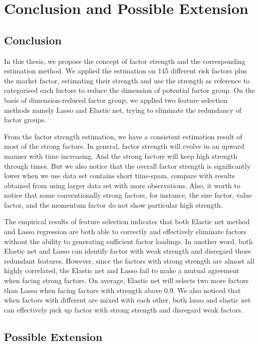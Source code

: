 	\chapter{Conclusion and Possible Extension}\label{Conclusion}
		\section{Conclusion}
In this thesis, we propose the concept of factor strength and the corresponding estimation method.
We applied the estimation on 145 different risk factors plus the market factor, estimating their strength and use the strength as reference to categorised each factors to reduce the dimension of potential factor group.
On the basis of dimension-reduced factor group, we applied two feature selection methods namely Lasso and Elastic net, trying to eliminate the redundancy of factor groups. 

From the factor strength estimation, we have a consistent estimation result of most of the strong factors.
In general, factor strength will evolve in an upward manner with time increasing.
And the strong factors will keep high strength through times.
But we also notice that the overall factor strength is significantly lower when we use data set contains short time-spam, compare with results obtained from using larger data set with more observations.
Also, it worth to notice that some conventionally strong factors, for instance, the size factor, value factor, and the momentum factor do not show particular high strength.

The empirical results of feature selection indicates that both Elastic net method and Lasso regression are both able to correctly and effectively eliminate factors without the ability to generating sufficient factor loadings.
In another word, both Elastic net and Lasso can identify factor with weak strength and disregard those redundant features.
However, since the factors with strong strength are almost all highly correlated, the Elastic net and Lasso fail to make a mutual agreement when facing strong factors.
On average, Elastic net will selects two more factors than Lasso when facing factors with strength above 0.9.
We also noticed that when factors with different are mixed with each other, both lasso and elastic net can effectively pick up factor with strong strength and disregard weak factors.

\section{Possible Extension}

